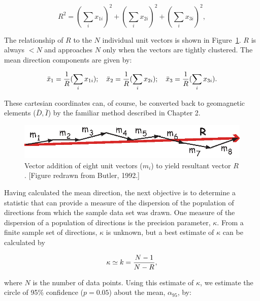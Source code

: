 \begin{equation} 
{R^2} = (\sum_{i} x_{1i})^2 + (\sum_i x_{2i})^2 + (\sum_i x_{3i})^2,
\label{eq:R}
\end{equation}


\noindent
The relationship of $R$ to the $N$ individual unit vectors is shown in Figure~\ref{fig:vecsum}. $ R$ is always $<N$ and approaches
$N $ only when the vectors are tightly clustered. The mean direction components  are given by:

\begin{equation} 
\bar x_1 = {1\over R} (\sum_i x_{1i}) ; \hskip 1em \bar x_2 = {1\over R} (\sum_i x_{2i}); \hskip 1em 
 \bar x_3 = {1\over R} (\sum_i x_{3i}).
\label{eq:xbar} \end{equation}

\noindent
These cartesian coordinates 
can, of course, be converted back to geomagnetic elements ($\bar D,
\bar I$) by the familiar method described in  Chapter 2.


\begin{figure}[htb]
\centering  \includegraphics[width= 10 cm]{EPSfiles/vecsum.eps}
\caption{Vector addition of eight unit vectors ($m_i$) to yield resultant vector $R$.  [Figure redrawn from Butler, 1992.]  }
\label{fig:vecsum}
\end{figure}  


%
Having calculated the mean direction, the next objective is to determine a statistic that can provide a measure
of the dispersion of the population of directions from which the sample data set was drawn. One
measure of the dispersion of a population of directions is the precision parameter, $\kappa$. From a finite sample
set of directions, $\kappa$ is unknown, but a best estimate of $\kappa$  can be calculated by

\begin{equation}
\kappa \simeq k
={{N-1}\over {N-R}},
\label{eq:k}
\end{equation}

\noindent  where $N$ is the number of data points. 
Using this
estimate of $\kappa $, we estimate the circle of 95\% confidence ($p=0.05$) about the
mean, $\alpha_{95}$, by:
%

